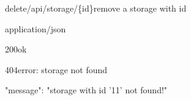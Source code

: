 \documentclass[12pt,a4paper]{article}
\begin{document}
\begin{apiRoute}{delete}{/api/storage/\{id\}}{remove a storage with id}
	\begin{routeParameter}
	\end{routeParameter}
	\begin{routeResponse}{application/json}
		\begin{routeResponseItem}{200}{ok}
			
		\end{routeResponseItem}
		\begin{routeResponseItem}{404}{error: storage not found}
			\begin{routeResponseItemBody}
{
	"message": "storage with id '11' not found!"
}
			\end{routeResponseItemBody}
		\end{routeResponseItem}
	\end{routeResponse}
\end{apiRoute}
\end{document}
